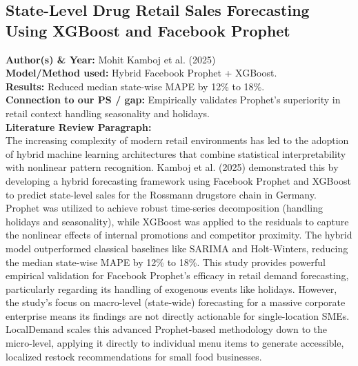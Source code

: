 \documentclass[conference]{IEEEtran}
\begin{document}
\subsection{State-Level Drug Retail Sales Forecasting Using XGBoost and Facebook Prophet}
\textbf{Author(s) \& Year:} Mohit Kamboj et al. (2025)\\
\textbf{Model/Method used:} Hybrid Facebook Prophet + XGBoost.\\
\textbf{Results:} Reduced median state-wise MAPE by 12\% to 18\%.\\
\textbf{Connection to our PS / gap:} Empirically validates Prophet's superiority in retail context handling seasonality and holidays.\\
\textbf{Literature Review Paragraph:}\\
The increasing complexity of modern retail environments has led to the adoption of hybrid machine learning architectures that combine statistical interpretability with nonlinear pattern recognition. Kamboj et al. (2025) demonstrated this by developing a hybrid forecasting framework using Facebook Prophet and XGBoost to predict state-level sales for the Rossmann drugstore chain in Germany. Prophet was utilized to achieve robust time-series decomposition (handling holidays and seasonality), while XGBoost was applied to the residuals to capture the nonlinear effects of internal promotions and competitor proximity. The hybrid model outperformed classical baselines like SARIMA and Holt-Winters, reducing the median state-wise MAPE by 12\% to 18\%. This study provides powerful empirical validation for Facebook Prophet's efficacy in retail demand forecasting, particularly regarding its handling of exogenous events like holidays. However, the study's focus on macro-level (state-wide) forecasting for a massive corporate enterprise means its findings are not directly actionable for single-location SMEs. LocalDemand scales this advanced Prophet-based methodology down to the micro-level, applying it directly to individual menu items to generate accessible, localized restock recommendations for small food businesses.
\end{document}
